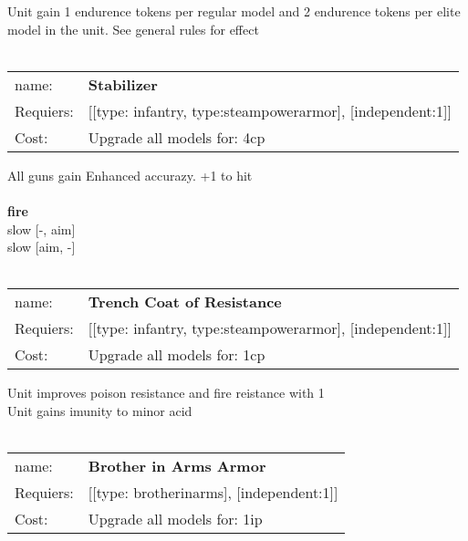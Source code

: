 Unit gain 1 endurence tokens per regular model  and 2 endurence tokens per elite model in the unit. See general rules for effect\\ 









\ \\
\begin{tabular}{ll}
name: & {\bf Stabilizer } \\
Requiers: & [[type: infantry, type:steampowerarmor], [independent:1]] \\
Cost: & Upgrade all models for: 4cp \\
\end{tabular}

All guns gain Enhanced accurazy. +1 to hit\\ 








\ \\ {\bf fire } \\
slow [-, aim] \\
slow [aim, -] \\

\ \\
\begin{tabular}{ll}
name: & {\bf Trench Coat of Resistance } \\
Requiers: & [[type: infantry, type:steampowerarmor], [independent:1]] \\
Cost: & Upgrade all models for: 1cp \\
\end{tabular}

Unit improves poison resistance and fire reistance with 1\\ 
Unit gains imunity to minor acid\\ 









\ \\
\begin{tabular}{ll}
name: & {\bf Brother in Arms Armor } \\
Requiers: & [[type: brotherinarms], [independent:1]] \\
Cost: & Upgrade all models for: 1ip \\
\end{tabular}


